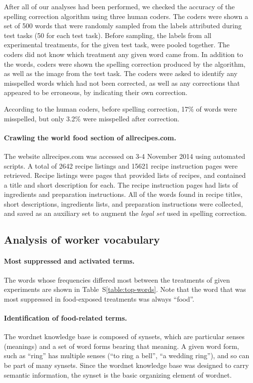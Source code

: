\documentclass{sigchi}
\begin{document}
	After all of our analyses had been performed, we checked the accuracy of 
	the spelling correction algorithm using three human coders.  The coders
	were shown a set of 
	500 words that were randomly sampled from the labels attributed during 
	test tasks (50 for each test task).  Before sampling, the labels from all
	experimental treatments, for the given test task, were pooled together.
	The coders did not know which treatment any given word came from.  
	In addition to the words, coders were shown the spelling correction 
	produced by the algorithm, as well as the image from the test task.
	The coders were asked to identify any misspelled words which had not 
	been corrected, as well as any corrections that appeared to be erroneous,
	by indicating their own correction.

	According to the human coders, before spelling correction, 17\% of words 
	were misspelled, but only 3.2\% were misspelled after correction.

	\paragraph{Crawling the world food section of allrecipes.com.}
	The website allrecipes.com was accessed on 3-4 November 2014 using 
	automated scripts.  A total of 2642 recipe listings and 15621 recipe
	instruction pages were retrieved.  Recipe listings were pages that 
	provided lists of recipes, and contained a title and short description 
	for each.  
	The recipe instruction pages had lists of ingredients and preparation 
	instructions.  All of the words found in recipe titles, short
	descriptions, ingredients lists, and preparation instructions were
	collected, and saved as an auxiliary set to augment the \textit{legal set}
	used in spelling correction.
	

\subsection*{Analysis of worker vocabulary}
\paragraph{Most suppressed and activated terms.}
The words whose frequencies differed most between the treatments of given 
experiments are shown in Table~S\ref{table:top-words}.  Note that 
the word that was most suppressed in food-exposed treatments was always 
``food''.


\paragraph{Identification of food-related terms.}
The wordnet knowledge base is composed of synsets, 
which are particular senses 
(meanings) and a set of word forms bearing that meaning. A given word form, 
such as ``ring'' has multiple senses (``to ring a bell'', ``a wedding ring''),
and so can be part of many synsets.  Since the wordnet 
knowledge base was designed
to carry semantic information, the synset is the basic organizing element
of wordnet.
\end{document}
